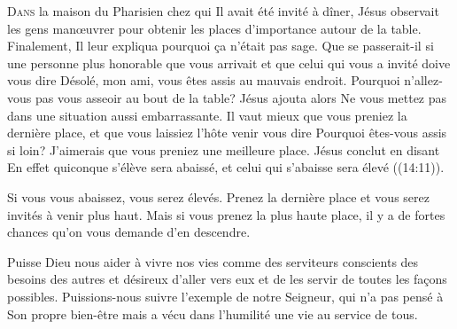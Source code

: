 

\lettrine{D}{ans} la maison du Pharisien chez qui Il avait été invité à dîner,
 Jésus observait les gens man\oe{}uvrer pour obtenir les places
 d'importance autour de la table. Finalement, Il leur expliqua pourquoi
 \c{c}a n'était pas sage.
 \Og Que se passerait-il si une personne plus honorable que vous arrivait
 et que celui qui vous a invité doive vous dire\frcolon{} 
 \Og Désolé, mon ami, vous êtes assis au mauvais endroit.
 Pourquoi n'allez-vous pas vous asseoir au bout de la table? \Fg{}
 Jésus ajouta alors\frcolon{} 
 \Og Ne vous mettez pas dans une situation aussi embarrassante.
 Il vaut mieux que vous preniez la dernière place, et que vous laissiez
 l'hôte venir vous dire\frcolon{} 
 \Og Pourquoi êtes-vous assis si loin?
 J'aimerais que vous preniez une meilleure place. \Fg{}
 Jésus conclut en disant\frcolon{}
 \Og En effet quiconque s'élève sera abaissé,
 et celui qui s'abaisse sera élevé \Fg{} ((14:11)).


Si vous vous abaissez, vous serez élevés.
 Prenez la dernière place et vous serez invités à venir plus haut.
 Mais si vous prenez la plus haute place,
 il y a de fortes chances qu'on vous demande d'en descendre.

Puisse Dieu nous aider à vivre nos vies comme des serviteurs
 \ocadr conscients des besoins des autres et désireux d'aller vers eux
 et de les servir de toutes les fa\c{c}ons possibles.
 Puissions-nous suivre l'exemple de notre Seigneur,
 qui n'a pas pensé à Son propre bien-être mais a vécu
 dans l'humilité une vie au service de tous.

\dvrule




